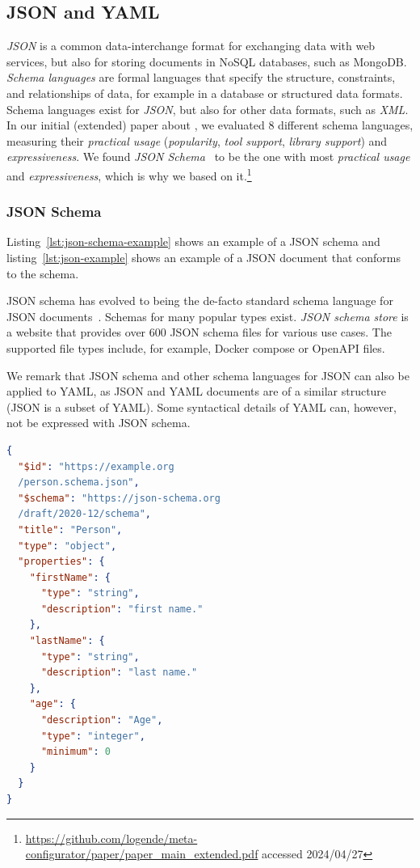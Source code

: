 \subsection{JSON and YAML}

\textit{JSON} is a common data-interchange format for exchanging data with web services, but also for storing documents in NoSQL databases, such as MongoDB\@\cite{marrs2017json}.
\textit{Schema languages} are formal languages that specify the structure, constraints, and relationships of data, for example in a database or structured data formats.
Schema languages exist for \textit{JSON}\cite{cuelang,Apache-Avro,rfc8927,Kappestein_2023}, but also for other data formats, such as \textit{XML}\cite{dtd_spec, xsd_spec, xml_schemas_1, xml_schemas_2}.
In our initial (extended) paper about \toolname{}, we evaluated 8 different schema languages, measuring their \textit{practical usage} (\textit{popularity}, \textit{tool support}, \textit{library support}) and \textit{expressiveness}.
We found \textit{JSON Schema}~\cite{jsonSchema, jsonschemaJSONSchema} to be the one with most \textit{practical usage} and \textit{expressiveness}, which is why we based \toolname{} on it.\footnote{\url{https://github.com/logende/meta-configurator/paper/paper_main_extended.pdf} accessed 2024/04/27}

\subsubsection{JSON Schema}
Listing~\ref{lst:json-schema-example} shows an example of a JSON schema and listing~\ref{lst:json-example} shows an example of a JSON document that conforms to the schema.

JSON schema has evolved to being the de-facto standard schema language for JSON documents~\cite{baazizi2021empirical}.
Schemas for many popular \cfgfile{} types exist.
\textit{JSON schema store}\cite{schemastoreJSONSchema} is a website that provides over 600 JSON schema files for various use cases.
The supported file types include, for example, Docker compose or OpenAPI files.

We remark that JSON schema and other schema languages for JSON can also be applied to YAML, as JSON and YAML documents are of a similar structure (JSON is a subset of YAML).
Some syntactical details of YAML can, however, not be expressed with JSON schema.


\begin{lstlisting}[language=json,firstnumber=1,caption={JSON schema example},captionpos=b,label={lst:json-schema-example}]
{
  "$id": "https://example.org
  /person.schema.json",
  "$schema": "https://json-schema.org
  /draft/2020-12/schema",
  "title": "Person",
  "type": "object",
  "properties": {
    "firstName": {
      "type": "string",
      "description": "first name."
    },
    "lastName": {
      "type": "string",
      "description": "last name."
    },
    "age": {
      "description": "Age",
      "type": "integer",
      "minimum": 0
    }
  }
}
\end{lstlisting}


